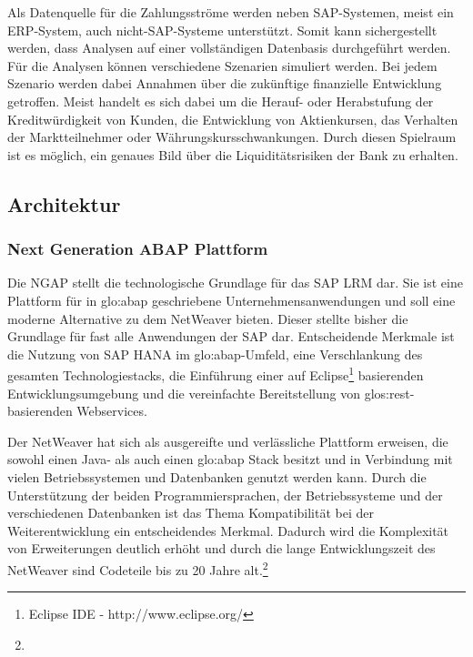 \begin{onehalfspacing}
Als Datenquelle für die Zahlungsströme werden neben SAP-Systemen, meist ein \gls{ERP}-System, auch nicht-SAP-Systeme unterstützt. Somit kann sichergestellt werden, dass Analysen auf einer vollständigen Datenbasis durchgeführt werden. Für die Analysen können verschiedene Szenarien simuliert werden. Bei jedem Szenario werden dabei Annahmen über die zukünftige finanzielle Entwicklung getroffen. Meist handelt es sich dabei um die Herauf- oder Herabstufung der Kreditwürdigkeit von Kunden, die Entwicklung von Aktienkursen, das Verhalten der Marktteilnehmer oder Währungskursschwankungen. Durch diesen Spielraum ist es möglich, ein genaues Bild über die Liquiditätsrisiken der Bank zu erhalten.


\subsection{Architektur}

\subsubsection{Next Generation ABAP Plattform}
Die \gls{NGAP} stellt die technologische Grundlage für das SAP LRM dar. Sie ist eine Plattform für in \gls{glo:abap} geschriebene Unternehmensanwendungen und soll eine moderne Alternative zu dem \gls{NetWeaver} bieten. Dieser stellte bisher die Grundlage für fast alle Anwendungen der SAP dar. Entscheidende Merkmale ist die Nutzung von SAP HANA im \gls{glo:abap}-Umfeld, eine Verschlankung des gesamten Technologiestacks, die Einführung einer auf Eclipse\footnote{Eclipse IDE - http://www.eclipse.org/} basierenden Entwicklungsumgebung und die vereinfachte Bereitstellung von \gls{glos:rest}-basierenden Webservices.

Der \gls{NetWeaver} hat sich als ausgereifte und verlässliche Plattform erweisen, die sowohl einen Java- als auch einen \gls{glo:abap} Stack besitzt und in Verbindung mit vielen Betriebssystemen und Datenbanken genutzt werden kann. Durch die Unterstützung der beiden Programmiersprachen, der Betriebssysteme und der verschiedenen Datenbanken ist das Thema Kompatibilität bei der Weiterentwicklung ein entscheidendes Merkmal. Dadurch wird die Komplexität von Erweiterungen deutlich erhöht und durch die lange Entwicklungszeit des \gls{NetWeaver} sind Codeteile bis zu 20 Jahre alt.\footnote{ }


\end{onehalfspacing}
